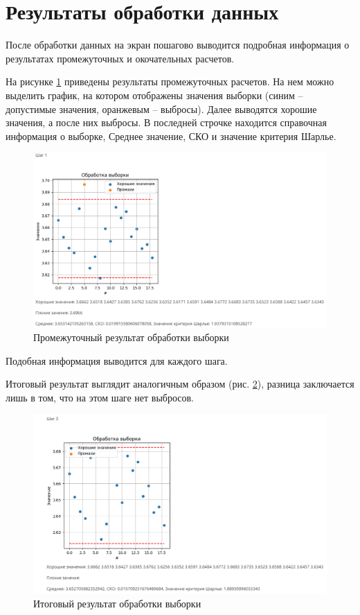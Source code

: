 \documentclass[a4paper,14pt]{article}
\begin{document}
\section{Результаты обработки данных}

	После обработки данных на экран пошагово выводится подробная информация о результатах промежуточных и окочательных расчетов.
	
	На рисунке \ref{fig:screenshot004} приведены результаты промежуточных расчетов.
	На нем можно выделить график, на котором отображены значения выборки (синим -- допустимые значения, оранжевым -- выбросы).
	Далее выводятся хорошие значения, а после них выбросы.
	В последней строчке находится справочная информация о выборке, Среднее значение, СКО и значение критерия Шарлье. 
	
	\begin{figure}[H]
		\centering
		\includegraphics[width=0.95\linewidth]{images/screenshot004}
		\caption{Промежуточный результат обработки выборки}
		\label{fig:screenshot004}
	\end{figure}

	Подобная информация выводится для каждого шага.	
	
	Итоговый результат выглядит аналогичным образом (рис. \ref{fig:screenshot005}), разница заключается лишь в том, что на этом шаге нет выбросов.
	
	\begin{figure}[H]
		\centering
		\includegraphics[width=0.95\linewidth]{images/screenshot005}
		\caption{Итоговый результат обработки выборки}
		\label{fig:screenshot005}
	\end{figure}
	
\end{document}
